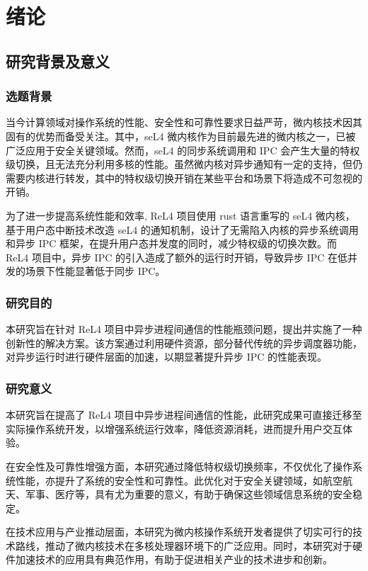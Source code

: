 \chapter{绪论}

\section{研究背景及意义}

\subsection{选题背景}

当今计算领域对操作系统的性能、安全性和可靠性要求日益严苛，微内核技术因其固有的优势而备受关注。其中，seL4 微内核作为目前最先进的微内核之一，已被广泛应用于安全关键领域。然而，seL4 的同步系统调用和 IPC 会产生大量的特权级切换，且无法充分利用多核的性能。虽然微内核对异步通知有一定的支持，但仍需要内核进行转发，其中的特权级切换开销在某些平台和场景下将造成不可忽视的开销。

为了进一步提高系统性能和效率, ReL4 项目使用 rust 语言重写的 seL4 微内核，基于用户态中断技术改造 seL4 的通知机制，设计了无需陷入内核的异步系统调用和异步 IPC 框架，在提升用户态并发度的同时，减少特权级的切换次数。而 ReL4 项目中，异步 IPC 的引⼊造成了额外的运⾏时开销，导致异步 IPC 在低并发的场景下性能显著低于同步 IPC。

\subsection{研究目的}

本研究旨在针对 ReL4 项目中异步进程间通信的性能瓶颈问题，提出并实施了一种创新性的解决方案。该方案通过利用硬件资源，部分替代传统的异步调度器功能，对异步运行时进行硬件层面的加速，以期显著提升异步 IPC 的性能表现。

\subsection{研究意义}

本研究旨在提高了 ReL4 项目中异步进程间通信的性能，此研究成果可直接迁移至实际操作系统开发，以增强系统运行效率，降低资源消耗，进而提升用户交互体验。

在安全性及可靠性增强方面，本研究通过降低特权级切换频率，不仅优化了操作系统性能，亦提升了系统的安全性和可靠性。此优化对于安全关键领域，如航空航天、军事、医疗等，具有尤为重要的意义，有助于确保这些领域信息系统的安全稳定。

在技术应用与产业推动层面，本研究为微内核操作系统开发者提供了切实可行的技术路线，推动了微内核技术在多核处理器环境下的广泛应用。同时，本研究对于硬件加速技术的应用具有典范作用，有助于促进相关产业的技术进步和创新。

